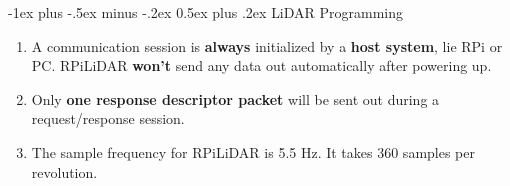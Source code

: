 \documentclass[10pt, landscape]{article}
\makeatletter
\renewcommand{\section}{\@startsection{section}{1}{0mm}%
                                {-1ex plus -.5ex minus -.2ex}%
                                {0.5ex plus .2ex}%
                                {\normalfont\large\bfseries}}
\makeatother
\begin{document}
\raggedright
\footnotesize
\begin{multicols}{4}


\setlength{\columnseprule}{0.25pt}
\setlength{\premulticols}{1pt}
\setlength{\postmulticols}{1pt}
\setlength{\multicolsep}{1pt}
\setlength{\columnsep}{2pt}

\begin{center}
\end{center}

\section{LiDAR Programming}
\begin{enumerate}
    \item A communication session is \textbf{always} initialized by a \textbf{host system}, lie RPi or PC. RPiLiDAR \textbf{won't} send any data out automatically after powering up.
    \item Only \textbf{one response descriptor packet} will be sent out during a request/response session.
    \item The sample frequency for RPiLiDAR is 5.5 Hz. It takes 360 samples per revolution.
\end{enumerate}


\end{multicols}
\end{document}
